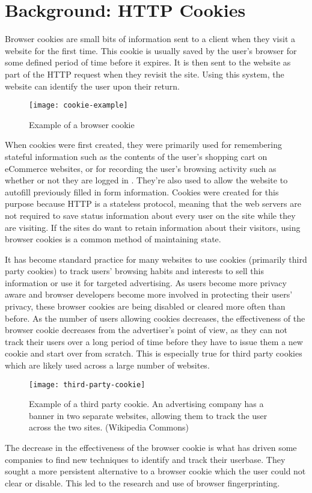 \chapter{Background: HTTP Cookies}

Browser cookies are small bits of information sent to a client when they visit a website for the first time.
This cookie is usually saved by the user's browser for some defined period of time before it expires.
It is then sent to the website as part of the HTTP request when they revisit the site.
Using this system, the website can identify the user upon their return.

\begin{figure}[h]
\texttt{[image: cookie-example]}
\centering
\caption{Example of a browser cookie}
\end{figure}

When cookies were first created, they were primarily used for remembering stateful information such as the contents of the user's shopping cart on eCommerce websites, or for recording the user's browsing activity such as whether or not they are logged in \citep{cookiesbackground}.
They're also used to allow the website to autofill previously filled in form information.
Cookies were created for this purpose because HTTP is a stateless protocol, meaning that the web servers are not required to save status information about every user on the site while they are visiting.
If the sites do want to retain information about their visitors, using browser cookies is a common method of maintaining state.

It has become standard practice for many websites to use cookies (primarily third party cookies) to track users' browsing habits and interests to sell this information or use it for targeted advertising.
As users become more privacy aware and browser developers become more involved in protecting their users' privacy, these browser cookies are being disabled or cleared more often than before.
As the number of users allowing cookies decreases, the effectiveness of the browser cookie decreases from the advertiser's point of view, as they can not track their users over a long period of time before they have to issue them a new cookie and start over from scratch.
This is especially true for third party cookies which are likely used across a large number of websites.

\begin{figure}[h]
\texttt{[image: third-party-cookie]}
\centering
\caption{Example of a third party cookie.
An advertising company has a banner in two separate websites, allowing them to track the user across the two sites. (Wikipedia Commons)}
\end{figure}

The decrease in the effectiveness of the browser cookie is what has driven some companies to find new techniques to identify and track their userbase.
They sought a more persistent alternative to a browser cookie which the user could not clear or disable.
This led to the research and use of browser fingerprinting.

